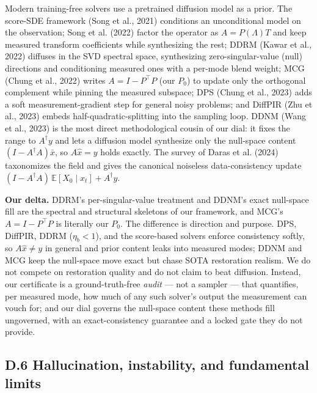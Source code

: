 \documentclass[11pt]{article}
\begin{document}
Modern training-free solvers use a pretrained diffusion model as a prior. The score-SDE framework (Song et al., 2021) conditions an unconditional model on the observation; Song et al. (2022) factor the operator as $A = P(\Lambda)T$ and keep measured transform coefficients while synthesizing the rest; DDRM (Kawar et al., 2022) diffuses in the SVD spectral space, synthesizing zero-singular-value (null) directions and conditioning measured ones with a per-mode blend weight; MCG (Chung et al., 2022) writes $A = I - P^\top P$ (our $P_0$) to update only the orthogonal complement while pinning the measured subspace; DPS (Chung et al., 2023) adds a soft measurement-gradient step for general noisy problems; and DiffPIR (Zhu et al., 2023) embeds half-quadratic-splitting into the sampling loop. DDNM (Wang et al., 2023) is the most direct methodological cousin of our dial: it fixes the range to $A^\dagger y$ and lets a diffusion model synthesize only the null-space content $(I - A^\dagger A) \bar{x}$, so $A\hat{x} = y$ holds exactly. The survey of Daras et al. (2024) taxonomizes the field and gives the canonical noiseless data-consistency update $(I - A^\dagger A)\, \mathbb{E}[X_0 \mid x_t] + A^\dagger y$.

\textbf{Our delta.} DDRM's per-singular-value treatment and DDNM's exact null-space fill are the spectral and structural skeletons of our framework, and MCG's $A = I - P^\top P$ is literally our $P_0$. The difference is direction and purpose. DPS, DiffPIR, DDRM ($\eta_b < 1$), and the score-based solvers enforce consistency softly, so $A\hat{x} \neq y$ in general and prior content leaks into measured modes; DDNM and MCG keep the null-space move exact but chase SOTA restoration realism. We do not compete on restoration quality and do not claim to beat diffusion. Instead, our certificate is a ground-truth-free \textit{audit} --- not a sampler --- that quantifies, per measured mode, how much of any such solver's output the measurement can vouch for; and our dial governs the null-space content these methods fill ungoverned, with an exact-consistency guarantee and a locked gate they do not provide.

\subsection*{D.6 Hallucination, instability, and fundamental limits}
\end{document}
